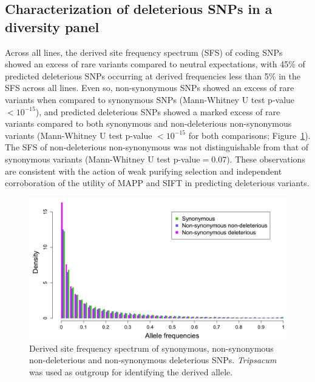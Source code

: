 \documentclass[12pt]{article}
\begin{document}
\subsection*{Characterization of deleterious SNPs in a diversity panel}

Across all lines, the derived site frequency spectrum (SFS) of coding SNPs showed an excess of rare variants compared to neutral expectations, with 45\% of predicted deleterious SNPs occurring at derived frequencies less than 5\% in the SFS across all lines. 
Even so, non-synonymous SNPs showed an excess of rare variants when compared to synonymous SNPs (Mann-Whitney U test p-value $<10^{-15}$), and predicted deleterious SNPs showed a marked excess of rare variants compared to both synonymous and non-deleterious non-synonymous variants (Mann-Whitney U test p-value $<10^{-15}$ for both comparisons; Figure~\ref{sfs_non_syn}). The SFS of non-deleterious non-synonymous was not distinguishable from that of synonymous variants (Mann-Whitney U test p-value$=0.07$). These observations are consistent with the action of weak purifying selection \citep{Cummings1998,Fay2001} and independent corroboration of the utility of MAPP and SIFT in predicting deleterious variants.

\begin{figure}[!t]
  \begin{center}
   \includegraphics[width=150mm]{SFS.png}
    \caption{Derived site frequency spectrum of synonymous,  non-synonymous  non-deleterious and non-synonymous deleterious SNPs. \emph{Tripsacum} was used as outgroup for identifying the derived allele.} 
\label{sfs_non_syn}
  \end{center}
\end{figure}
\end{document}
